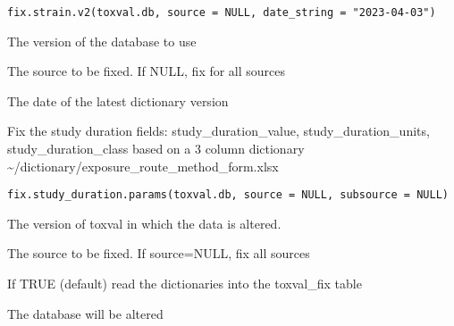 \documentclass[letterpaper]{book}
\begin{document}
%
\begin{Usage}
\begin{verbatim}
fix.strain.v2(toxval.db, source = NULL, date_string = "2023-04-03")
\end{verbatim}
\end{Usage}
%
\begin{Arguments}
\begin{ldescription}
\item[\code{toxval.db}] The version of the database to use

\item[\code{source}] The source to be fixed. If NULL, fix for all sources

\item[\code{date\_string}] The date of the latest dictionary version
\end{ldescription}
\end{Arguments}
%
\begin{Description}\relax
Fix the study duration fields: study\_duration\_value, study\_duration\_units, study\_duration\_class
based on a 3 column dictionary \textasciitilde{}/dictionary/exposure\_route\_method\_form.xlsx
\end{Description}
%
\begin{Usage}
\begin{verbatim}
fix.study_duration.params(toxval.db, source = NULL, subsource = NULL)
\end{verbatim}
\end{Usage}
%
\begin{Arguments}
\begin{ldescription}
\item[\code{toxval.db}] The version of toxval in which the data is altered.

\item[\code{source}] The source to be fixed. If source=NULL, fix all sources

\item[\code{fill.toxval\_fix}] If TRUE (default) read the dictionaries into the toxval\_fix table
\end{ldescription}
\end{Arguments}
%
\begin{Value}
The database will be altered
\end{Value}
\end{document}
